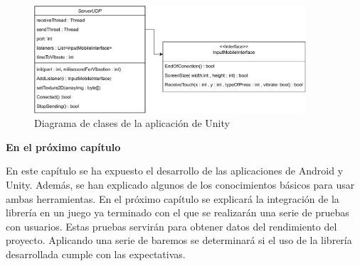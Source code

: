 \begin{figure}[h]

\centering
\includegraphics[width=0.9\textwidth]{./Imagenes/Vectorial/Arquitectura Unity.pdf}
\caption{Diagrama de clases de la aplicaci\'on de Unity}
\end{figure}

\bigskip
\Large{\textbf{En el pr\'oximo cap\'itulo}}\\
\normalsize

En este cap\'itulo se ha expuesto el desarrollo de las aplicaciones de Android y Unity. Adem\'as, se han explicado algunos de los conocimientos b\'asicos para usar ambas herramientas. En el pr\'oximo cap\'itulo se explicar\'a la integraci\'on de la librer\'ia en un juego ya terminado con el que se realizar\'an una serie de pruebas con usuarios. Estas pruebas servir\'an para obtener datos del rendimiento del proyecto. Aplicando una serie de baremos se determinar\'a si el uso de la librer\'ia desarrollada cumple con las expectativas.\\

